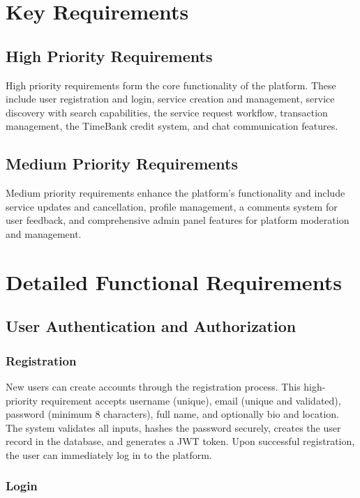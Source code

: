 \documentclass[12pt,a4paper]{report}
\begin{document}
\section{Key Requirements}

\subsection{High Priority Requirements}

High priority requirements form the core functionality of the platform. These include user registration and login, service creation and management, service discovery with search capabilities, the service request workflow, transaction management, the TimeBank credit system, and chat communication features.

\subsection{Medium Priority Requirements}

Medium priority requirements enhance the platform's functionality and include service updates and cancellation, profile management, a comments system for user feedback, and comprehensive admin panel features for platform moderation and management.

\section{Detailed Functional Requirements}

\subsection{User Authentication and Authorization}

\subsubsection{Registration}

New users can create accounts through the registration process. This high-priority requirement accepts username (unique), email (unique and validated), password (minimum 8 characters), full name, and optionally bio and location. The system validates all inputs, hashes the password securely, creates the user record in the database, and generates a JWT token. Upon successful registration, the user can immediately log in to the platform.

\subsubsection{Login}
\end{document}
